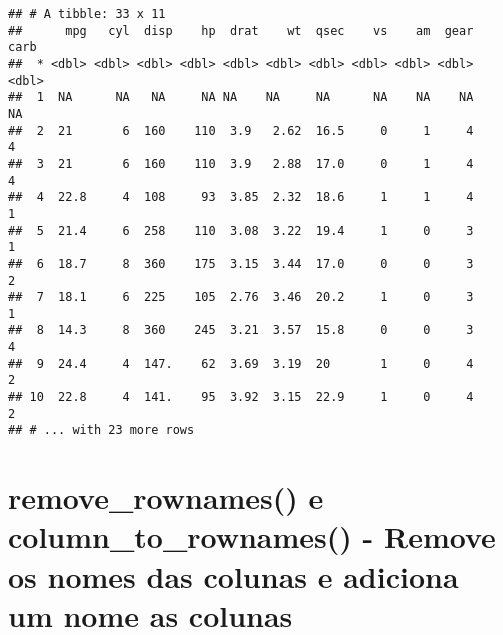 \documentclass[]{book}
\newenvironment{Shaded}{\begin{snugshade}}{\end{snugshade}}
\newcommand{\DataTypeTok}[1]{\textcolor[rgb]{0.13,0.29,0.53}{#1}}
\newcommand{\KeywordTok}[1]{\textcolor[rgb]{0.13,0.29,0.53}{\textbf{#1}}}
\newcommand{\NormalTok}[1]{#1}
\newcommand{\OperatorTok}[1]{\textcolor[rgb]{0.81,0.36,0.00}{\textbf{#1}}}
\newcommand{\StringTok}[1]{\textcolor[rgb]{0.31,0.60,0.02}{#1}}
\begin{document}
\begin{verbatim}
## # A tibble: 33 x 11
##      mpg   cyl  disp    hp  drat    wt  qsec    vs    am  gear  carb
##  * <dbl> <dbl> <dbl> <dbl> <dbl> <dbl> <dbl> <dbl> <dbl> <dbl> <dbl>
##  1  NA      NA   NA     NA NA    NA     NA      NA    NA    NA    NA
##  2  21       6  160    110  3.9   2.62  16.5     0     1     4     4
##  3  21       6  160    110  3.9   2.88  17.0     0     1     4     4
##  4  22.8     4  108     93  3.85  2.32  18.6     1     1     4     1
##  5  21.4     6  258    110  3.08  3.22  19.4     1     0     3     1
##  6  18.7     8  360    175  3.15  3.44  17.0     0     0     3     2
##  7  18.1     6  225    105  2.76  3.46  20.2     1     0     3     1
##  8  14.3     8  360    245  3.21  3.57  15.8     0     0     3     4
##  9  24.4     4  147.    62  3.69  3.19  20       1     0     4     2
## 10  22.8     4  141.    95  3.92  3.15  22.9     1     0     4     2
## # ... with 23 more rows
\end{verbatim}

\hypertarget{remove_rownames-e-column_to_rownames---remove-os-nomes-das-colunas-e-adiciona-um-nome-as-colunas}{%
\section{remove\_rownames() e column\_to\_rownames() - Remove os nomes das colunas e adiciona um nome as colunas}\label{remove_rownames-e-column_to_rownames---remove-os-nomes-das-colunas-e-adiciona-um-nome-as-colunas}}

\begin{Shaded}
\end{Shaded}
\end{document}
